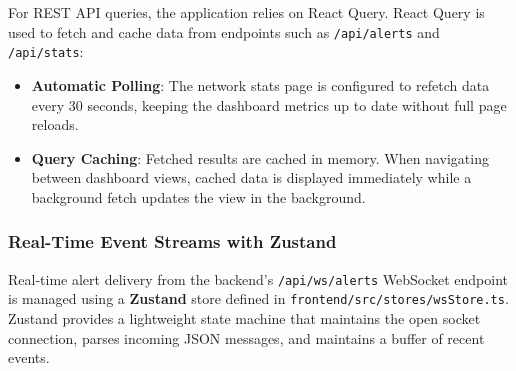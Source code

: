 \documentclass[12pt,a4paper]{report}
\begin{document}
For REST API queries, the application relies on React Query. React Query is used to fetch and cache data from endpoints such as \texttt{/api/alerts} and \texttt{/api/stats}:
\begin{itemize}[leftmargin=1.5em]
  \item \textbf{Automatic Polling}: The network stats page is configured to refetch data every 30 seconds, keeping the dashboard metrics up to date without full page reloads.
  \item \textbf{Query Caching}: Fetched results are cached in memory. When navigating between dashboard views, cached data is displayed immediately while a background fetch updates the view in the background.
\end{itemize}

\subsubsection{Real-Time Event Streams with Zustand}

Real-time alert delivery from the backend's \texttt{/api/ws/alerts} WebSocket endpoint is managed using a \textbf{Zustand} store defined in \texttt{frontend/src/stores/wsStore.ts}. Zustand provides a lightweight state machine that maintains the open socket connection, parses incoming JSON messages, and maintains a buffer of recent events.
\end{document}
